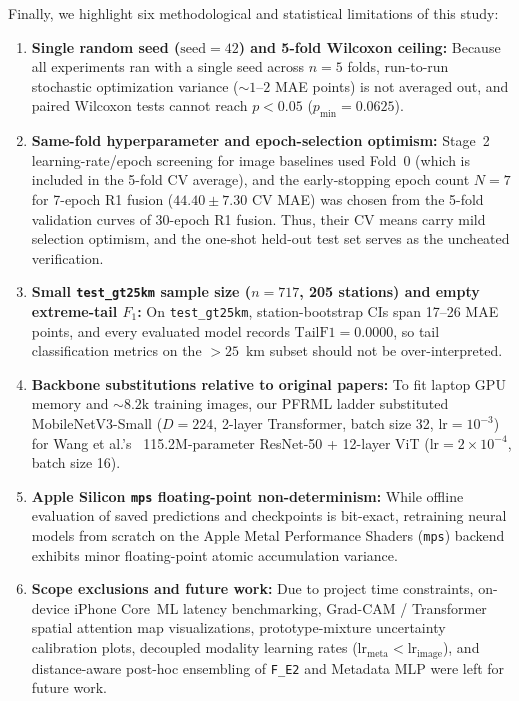 \documentclass[conference]{IEEEtran}
\begin{document}
Finally, we highlight six methodological and statistical limitations of this
study:
\begin{enumerate}
  \item \textbf{Single random seed ($\text{seed} = 42$) and 5-fold Wilcoxon
        ceiling:} Because all experiments ran with a single seed across $n = 5$
        folds, run-to-run stochastic optimization variance ($\sim 1\text{--}2$
        MAE points) is not averaged out, and paired Wilcoxon tests cannot reach
        $p < 0.05$ ($p_{\min} = 0.0625$).
  \item \textbf{Same-fold hyperparameter and epoch-selection optimism:} Stage~2
        learning-rate/epoch screening for image baselines used Fold~0 (which is
        included in the 5-fold CV average), and the early-stopping epoch count
        $N = 7$ for 7-epoch R1 fusion ($44.40 \pm 7.30$ CV MAE) was chosen from
        the 5-fold validation curves of 30-epoch R1 fusion. Thus, their CV means
        carry mild selection optimism, and the one-shot held-out test set serves
        as the uncheated verification.
  \item \textbf{Small \texttt{test\_gt25km} sample size ($n = 717$, 205
        stations) and empty extreme-tail $F_1$:} On \texttt{test\_gt25km},
        station-bootstrap CIs span 17--26 MAE points, and every evaluated model
        records $\text{TailF1} = 0.0000$, so tail classification metrics on the
        $> 25$~km subset should not be over-interpreted.
  \item \textbf{Backbone substitutions relative to original papers:} To fit
        laptop GPU memory and $\sim 8.2\text{k}$ training images, our PFRML
        ladder substituted MobileNetV3-Small ($D = 224$, 2-layer Transformer,
        batch size 32, $\text{lr} = 10^{-3}$) for Wang et
        al.'s~\cite{wangPrototypeFeatureRepresentationGuided2026}
        115.2M-parameter ResNet-50 + 12-layer ViT
        ($\text{lr} = 2 \times 10^{-4}$, batch size 16).
  \item \textbf{Apple Silicon \texttt{mps} floating-point non-determinism:}
        While offline evaluation of saved predictions and checkpoints is
        bit-exact, retraining neural models from scratch on the Apple Metal
        Performance Shaders (\texttt{mps}) backend exhibits minor floating-point
        atomic accumulation variance.
  \item \textbf{Scope exclusions and future work:} Due to project time
        constraints, on-device iPhone Core~ML latency benchmarking, Grad-CAM /
        Transformer spatial attention map visualizations, prototype-mixture
        uncertainty calibration plots, decoupled modality learning rates
        ($\text{lr}_{\text{meta}} < \text{lr}_{\text{image}}$), and
        distance-aware post-hoc ensembling of \texttt{F\_E2} and Metadata MLP
        were left for future work.
\end{enumerate}
\end{document}
